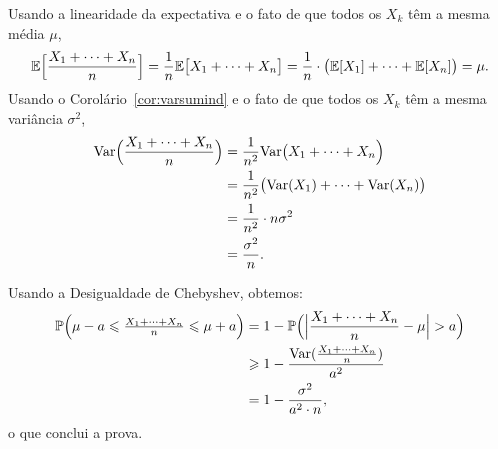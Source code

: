 Usando a linearidade da expectativa e o fato de que todos os $ X_k $ têm a mesma média $ \mu $,
\[
\mathbb{E}
\Big[ \frac{X_1+\dots+X_n}{n} \Big]
=
\frac{1}{n}
\mathbb{E}\big[ X_1+\dots+X_n \big]
=
\frac{1}{n}
\cdot
\big(
\mathbb{E}[ X_1 ]
+\dots+
\mathbb{E}[ X_n ]
\big)
= \mu.
\]
Usando o Corolário~\ref{cor:varsumind} e o fato de que todos os $ X_k $ têm a mesma variância $ \sigma^2 $,
\begin{align}
\mathrm{Var} \Big( \frac{X_1+\dots+X_n}{n} \Big)
&=
\frac{1}{n^2} \mathrm{Var} \big( X_1+\dots+X_n \Big)
\\
&=
\frac{1}{n^2} \big( \mathrm{Var} (X_1)+\dots+\mathrm{Var} (X_n) \big)
\\
&=
\frac{1}{n^2} \cdot n \sigma^2
\\
&=
\frac{\sigma^2}{n}
.
\end{align}

Usando a Desigualdade de Chebyshev, obtemos:
\begin{align}
\mathbb{P}\Big( \mu-a \leqslant \tfrac{X_1+\dots+X_n}{n} \leqslant \mu+a \Big)
&
=
1 - \mathbb{P}\Big( \Big|\frac{X_1+\dots+X_n}{n} - \mu \Big| > a \Big)
\\
&
\geqslant
1 - \frac{\mathrm{Var}(\frac{X_1+\dots+X_n}{n})}{a^2}
\\
&
=
1 - \frac{\sigma^2}{a^2 \cdot n}
,
\end{align}
o que conclui a prova.
